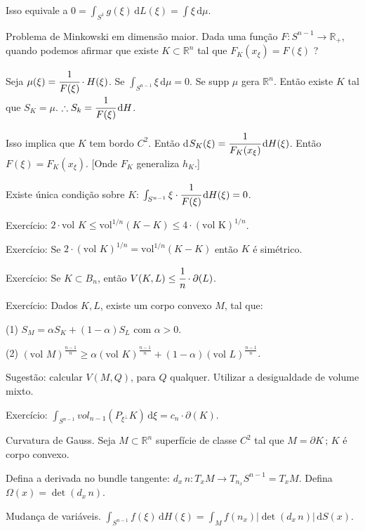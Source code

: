 \documentclass[12pt]{article}
\begin{document}
Isso equivale a $0 = \int_{S^1} g(\xi)\,\mathrm{d}L(\xi) = \int \xi \,\mathrm{d}\mu$.

Problema de Minkowski em dimens\~ao maior. Dada uma fun\c{c}\~ao $F: S^{n - 1} \to \mathbb{R}_+$, quando podemos afirmar que existe $K \subset \mathbb{R}^n$ tal que $F_K(x_\xi) = F(\xi)$ ?

Seja $\mu(\xi) = \cfrac{1}{F(\xi)}\cdot H(\xi)$. Se $\int_{S^{n - 1}} \xi \,\mathrm{d}\mu = 0$. Se supp $\mu$ gera $\mathbb{R}^n$. Ent\~ao existe $K$ tal que $S_K = \mu$. $\therefore S_k = \cfrac{1}{F(\xi)}\,\mathrm{d}H$.

Isso implica que $K$ tem bordo $C^2$. Ent\~ao d$S_K(\xi) = \cfrac{1}{F_K(x_\xi)} \,\mathrm{d}H(\xi)$. Ent\~ao $F(\xi) = F_K(x_\xi)$. [Onde $F_K$ generaliza $h_K$.]

Existe \'unica condi\c{c}\~ao sobre $K$: $\int_{S^{n - 1}} \xi \cdot \cfrac{1}{F(\xi)}\,\mathrm{d}H(\xi) = 0$.

Exerc\'icio: $2\cdot \text{vol }K \le \text{vol}^{1/n} (K - K) \le 4\cdot (\text{vol K})^{1/n}$.

Exerc\'icio: Se $2\cdot (\text{vol }K)^{1/n} = \text{vol}^{1/n} (K - K)$ ent\~ao $K$ \'e sim\'etrico.

Exerc\'icio: Se $K \subset B_n$, ent\~ao $V(K, L) \le \cfrac{1}{n}\cdot \partial(L)$.

\vspace{100mm}

Exerc\'icio: Dados $K, L$, existe um corpo convexo $M$, tal que:

(1) $S_M = \alpha S_K + (1 - \alpha) S_L$ com $\alpha > 0$.

(2) $(\text{vol }M)^{\frac{n-1}{n}} \ge \alpha (\text{vol }K)^{\frac{n-1}{n}} + (1 - \alpha) (\text{vol }L)^{\frac{n-1}{n}}$.

Sugest\~ao: calcular $V(M, Q)$, para $Q$ qualquer. Utilizar a desigualdade de volume mixto.

Exerc\'icio: $\int_{S^{n - 1}} vol_{n - 1} (P_{\xi^\perp} K)\,\mathrm{d}\xi = c_n\cdot \partial (K)$.

Curvatura de Gauss. Seja $M \subset \mathbb{R}^n$ superf\'icie de classe $C^2$ tal que $M = \partial K\,;\,K$ \'e corpo convexo.

Defina a derivada no bundle tangente: $d_x\,n : T_xM \to T_{n_x}S^{n - 1} = T_xM$. Defina $\Omega(x) = \det (d_x\,n)$.

Mudan\c{c}a de vari\'aveis. $\int_{S^{n - 1}} f(\xi)\,\mathrm{d}H(\xi) = \int_M f(n_x) |\det (d_x\,n)|\,\mathrm{d}S(x)$.
\end{document}
